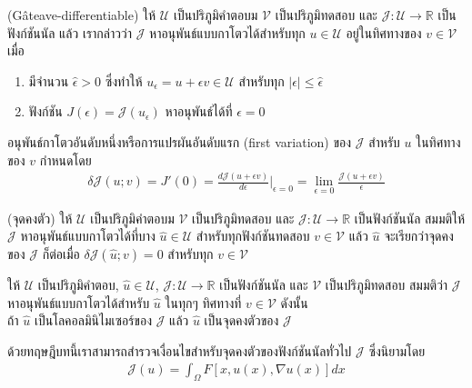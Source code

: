 \begin{Definition}
    (G\^{a}teave-differentiable)
    ให้ $\mathcal{U}$ เป็นปริภูมิคำตอบม $\mathcal{V}$ เป็นปริภูมิทดสอบ และ $\mathcal{J} : \mathcal{U} \rightarrow \mathbb{R}$ เป็นฟังก์ชันนัล แล้ว เรากล่าวว่า $\mathcal{J}$ หาอนุพันธ์แบบกาโตวได้สำหรับทุก $u \in \mathcal{U}$ อยู่ในทิศทางของ $v \in \mathcal{V}$ เมื่อ
    \begin{enumerate}
        \item มีจำนวน $\hat{\epsilon} > 0$ ซึ่งทำให้ $u_{\epsilon} = u + \epsilon v \in \mathcal{U}$ สำหรับทุก $|\epsilon| \leq \hat{\epsilon}$
        \item ฟังก์ชัน $J(\epsilon) = \mathcal{J}(u_\epsilon)$ หาอนุพันธ์ได้ที่ $\epsilon = 0$
    \end{enumerate}
    อนุพันธ์กาโตวอันดับหนึ่งหรือการแปรผันอันดับแรก (first variation) ของ $\mathcal{J}$ สำหรับ $u$ ในทิศทางของ $v$ กำหนดโดย
    \begin{align*}
        \delta \mathcal{J}(u;v) = J'(0) = \frac{d\mathcal{J}(u + \epsilon v)}{d \epsilon} \Big|_{\epsilon = 0} = \lim_{\epsilon = 0}\frac{\mathcal{J}(u + \epsilon v)}{\epsilon} 
    \end{align*}
\end{Definition}

\begin{Definition}
(จุดคงตัว) ให้ $\mathcal{U}$ เป็นปริภูมิคำตอบม $\mathcal{V}$ เป็นปริภูมิทดสอบ และ $\mathcal{J} : \mathcal{U} \rightarrow \mathbb{R}$ เป็นฟังก์ชันนัล สมมติให้ $\mathcal{J}$ หาอนุพันธ์แบบกาโตวได้ที่บาง $\hat{u} \in \mathcal{U}$ สำหรับทุกฟังก์ชันทดสอบ $v \in \mathcal{V}$ แล้ว $\hat{u}$ จะเรียกว่าจุดคงของ $\mathcal{J}$ ก็ต่อเมื่อ $\delta\mathcal{J}(\hat{u};v) = 0$ สำหรับทุก $v \in \mathcal{V}$
\end{Definition}

\begin{Theorem}
    ให้ $\mathcal{U}$ เป็นปริภูมิคำตอบ, $\hat{u} \in \mathcal{U}$, $\mathcal{J} : \mathcal{U} \rightarrow \mathbb{R}$ เป็นฟังก์ชันนัล และ $\mathcal{V}$ เป็นปริภูมิทดสอบ สมมติว่า $\mathcal{J}$ หาอนุพันธ์แบบกาโตวได้สำหรับ $\hat{u}$ ในทุกๆ ทิศทางที่ $v \in \mathcal{V}$ ดังนั้น
    \\
    \hspace{1cm} ถ้า $\hat{u}$ เป็นโลคอลมินิไมเซอร์ของ $\mathcal{J}$ แล้ว $\hat{u}$ เป็นจุดคงตัวของ  $\mathcal{J}$\\
\end{Theorem}
\hspace{1cm} ด้วยทฤษฎีบทนี้เราสามารถสำรวจเงื่อนไขสำหรับจุดคงตัวของฟังก์ชันนัลทั่วไป $\mathcal{J}$ ซึ่งนิยามโดย
\begin{align}
    \mathcal{J}(u) = \int_{\Omega} F[x,u(x),\nabla u(x)] dx
    \label{equation:general_functional}
\end{align}

